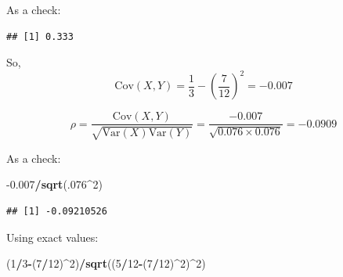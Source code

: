 \documentclass[
]{book}
\newenvironment{Shaded}{\begin{snugshade}}{\end{snugshade}}
\newcommand{\CommentTok}[1]{\textcolor[rgb]{0.56,0.35,0.01}{\textit{#1}}}
\newcommand{\ControlFlowTok}[1]{\textcolor[rgb]{0.13,0.29,0.53}{\textbf{#1}}}
\newcommand{\DataTypeTok}[1]{\textcolor[rgb]{0.13,0.29,0.53}{#1}}
\newcommand{\DecValTok}[1]{\textcolor[rgb]{0.00,0.00,0.81}{#1}}
\newcommand{\FloatTok}[1]{\textcolor[rgb]{0.00,0.00,0.81}{#1}}
\newcommand{\KeywordTok}[1]{\textcolor[rgb]{0.13,0.29,0.53}{\textbf{#1}}}
\newcommand{\NormalTok}[1]{#1}
\newcommand{\OperatorTok}[1]{\textcolor[rgb]{0.81,0.36,0.00}{\textbf{#1}}}
\newcommand{\StringTok}[1]{\textcolor[rgb]{0.31,0.60,0.02}{#1}}
\begin{document}
As a check:

\begin{Shaded}
\end{Shaded}

\begin{verbatim}
## [1] 0.333
\end{verbatim}

So,
\[
\mbox{Cov}(X,Y)=\frac{1}{3}-\left(\frac{7}{12}\right)^2=-0.007
\]

\[
\rho=\frac{\mbox{Cov}(X,Y)}{\sqrt{\mbox{Var}(X)\mbox{Var}(Y)}}=\frac{-0.007}{\sqrt{0.076\times0.076}}=-0.0909
\]

As a check:

\begin{Shaded}
\begin{Highlighting}[]
\FloatTok{-0.007}\OperatorTok{/}\KeywordTok{sqrt}\NormalTok{(.}\DecValTok{076}\OperatorTok{^}\DecValTok{2}\NormalTok{)}
\end{Highlighting}
\end{Shaded}

\begin{verbatim}
## [1] -0.09210526
\end{verbatim}

Using exact values:

\begin{Shaded}
\begin{Highlighting}[]
\NormalTok{(}\DecValTok{1}\OperatorTok{/}\DecValTok{3}\OperatorTok{-}\NormalTok{(}\DecValTok{7}\OperatorTok{/}\DecValTok{12}\NormalTok{)}\OperatorTok{^}\DecValTok{2}\NormalTok{)}\OperatorTok{/}\KeywordTok{sqrt}\NormalTok{((}\DecValTok{5}\OperatorTok{/}\DecValTok{12}\OperatorTok{-}\NormalTok{(}\DecValTok{7}\OperatorTok{/}\DecValTok{12}\NormalTok{)}\OperatorTok{^}\DecValTok{2}\NormalTok{)}\OperatorTok{^}\DecValTok{2}\NormalTok{)}
\end{Highlighting}
\end{Shaded}
\end{document}
